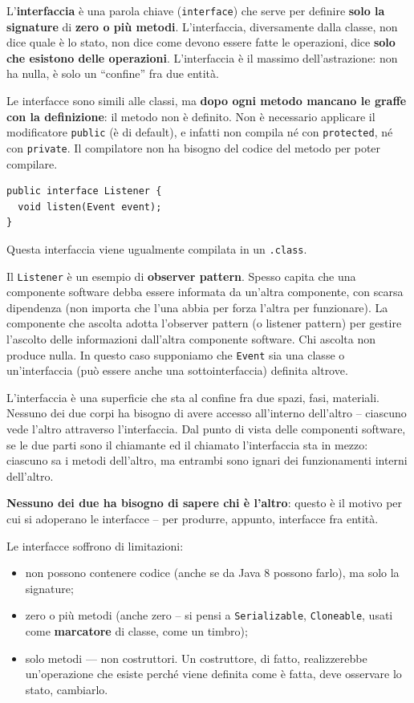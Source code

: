 \documentclass[\fontsizeclass,twocolumn]{\classname}
\theoremstyle{definition}
\theoremstyle{definition}
\begin{document}
L'\textbf{interfaccia} è una parola chiave (\texttt{interface}) che serve per
definire \textbf{solo la signature} di \textbf{zero o più metodi}.
L'interfaccia, diversamente dalla classe, non dice quale è lo stato, non dice
come devono essere fatte le operazioni, dice \textbf{solo che esistono delle
operazioni}. L'interfaccia è il massimo dell'astrazione: non ha nulla, è solo
un ``confine'' fra due entità.

Le interfacce sono simili alle classi, ma \textbf{dopo ogni metodo mancano le
graffe con la definizione}: il metodo non è definito. Non è necessario
applicare il modificatore \texttt{public} (è di default), e infatti non compila
né con \texttt{protected}, né con \texttt{private}. Il compilatore non ha
bisogno del codice del metodo per poter compilare.

\begin{lstlisting}
public interface Listener {
  void listen(Event event);
}
\end{lstlisting}

Questa interfaccia viene ugualmente compilata in un \texttt{.class}.

Il \texttt{Listener} è un esempio di \textbf{observer pattern}. Spesso capita
che una componente software debba essere informata da un'altra componente, con
scarsa dipendenza (non importa che l'una abbia per forza l'altra per
funzionare). La componente che ascolta adotta l'observer pattern (o listener
pattern) per gestire l'ascolto delle informazioni dall'altra componente
software. Chi ascolta non produce nulla. In questo caso supponiamo che
\texttt{Event} sia una classe o un'interfaccia (può essere anche una
sottointerfaccia) definita altrove.

L'interfaccia è una superficie che sta al confine fra due spazi, fasi,
materiali. Nessuno dei due corpi ha bisogno di avere accesso all'interno
dell'altro -- ciascuno vede l'altro attraverso l'interfaccia. Dal punto di
vista delle componenti software, se le due parti sono il chiamante ed il
chiamato l'interfaccia sta in mezzo: ciascuno sa i metodi dell'altro, ma
entrambi sono ignari dei funzionamenti interni dell'altro.

\textbf{Nessuno dei due ha bisogno di sapere chi è l'altro}: questo è il motivo
per cui si adoperano le interfacce -- per produrre, appunto, interfacce fra
entità.

Le interfacce soffrono di limitazioni:
\begin{itemize}
    \item non possono contenere codice (anche se da Java 8 possono farlo), ma
        solo la signature;
    \item zero o più metodi (anche zero -- si pensi a \texttt{Serializable},
        \texttt{Cloneable}, usati come \textbf{marcatore} di classe, come un
        timbro);
    \item solo metodi --- non costruttori. Un costruttore, di fatto,
        realizzerebbe un'operazione che esiste perché viene definita come è
        fatta, deve osservare lo stato, cambiarlo.
\end{itemize}
\end{document}
